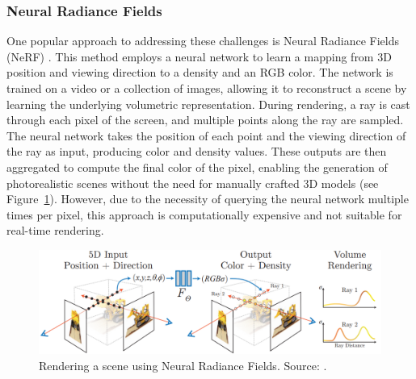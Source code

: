 \documentclass[12pt]{article}
\begin{document}
\subsubsection{Neural Radiance Fields}
One popular approach to addressing these challenges is Neural Radiance Fields (NeRF) \parencite{Nerf}. This method employs a neural network to learn a mapping from 3D position and viewing direction to a density and an RGB color. The network is trained on a video or a collection of images, allowing it to reconstruct a scene by learning the underlying volumetric representation. During rendering, a ray is cast through each pixel of the screen, and multiple points along the ray are sampled. The neural network takes the position of each point and the viewing direction of the ray as input, producing color and density values. These outputs are then aggregated to compute the final color of the pixel, enabling the generation of photorealistic scenes without the need for manually crafted 3D models (see Figure~\ref{fig:nerf}). However, due to the necessity of querying the neural network multiple times per pixel, this approach is computationally expensive and not suitable for real-time rendering.
\begin{figure}[h!]
	\centering
	\includegraphics[width=\textwidth]{Images/Nerf.png}
	\caption{Rendering a scene using Neural Radiance Fields. Source: \cite{Nerf}.}
	\label{fig:nerf}
\end{figure}
\end{document}

